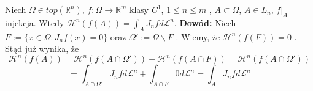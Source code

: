 \begin{tw}
	Niech $\Omega \in top(\mathbb{R}^n)$, $f: \Omega \rightarrow \mathbb{R}^m$ klasy $C^1$, $1 \leq n \leq m$  , $A \subset \Omega$, $A \in L_n$, $f|_A$ injekcja. Wtedy $\mathcal{H}^n(f(A)) = \int_A J_nf d \mathcal{L}^n$.
	\newline\newline
	\textbf{Dowód:}\newline
	Niech $F := \{x \in \Omega: J_nf(x) = 0\}$ oraz $\Omega' := \Omega \backslash F$ . Wiemy, że $\mathcal{H}^n(f(F)) = 0$ . Stąd już wynika, że 
	$$
		\mathcal{H}^n(f(A)) = \mathcal{H}^n(f(A \cap \Omega')) + \mathcal{H}^n(f(A \cap F)) = \mathcal{H}^n(f(A \cap \Omega')) 
	$$
	$$
		= \int_{A \cap \Omega'} J_nf d \mathcal{L}^n + \int_{A \cap F} 0 d \mathcal{L}^n = \int_{A} J_nf d \mathcal{L}^n
	$$ 
\end{tw}